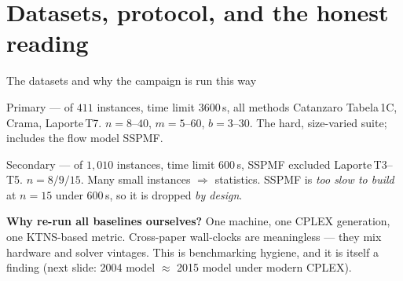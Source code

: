 \documentclass[10pt]{beamer}
\newcommand{\good}[1]{\textcolor{tight}{#1}}
\begin{document}
\section{Datasets, protocol, and the honest reading}
\begin{frame}{The datasets and why the campaign is run this way}
\begin{block}{Primary --- of $411$ instances, time limit $3600$\,s, all methods}
Catanzaro Tabela\,1C, Crama, Laporte\,T7. \; $n=8$--$40$, $m=5$--$60$, $b=3$--$30$.
The hard, size-varied suite; includes the flow model SSPMF.
\end{block}
\begin{block}{Secondary --- of $1{,}010$ instances, time limit $600$\,s, SSPMF excluded}
Laporte\,T3--T5. \; $n=8/9/15$. Many small instances $\Rightarrow$ statistics.
SSPMF is \emph{too slow to build} at $n=15$ under $600$\,s, so it is dropped \emph{by design}.
\end{block}
\textbf{Why re-run all baselines ourselves?} One machine, one CPLEX generation, one
KTNS-based metric. \good{Cross-paper wall-clocks are meaningless} --- they mix hardware
and solver vintages. This is benchmarking hygiene, and it is itself a finding
(next slide: 2004 model $\approx$ 2015 model under modern CPLEX).
\end{frame}
\end{document}
